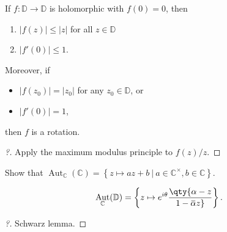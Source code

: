 \begin{theorem}\label{SchwarzzLemma}

If \(f: {\mathbb{D}}\to {\mathbb{D}}\) is holomorphic with \(f(0) = 0\),
then

\begin{enumerate}
\def\labelenumi{\arabic{enumi}.}
\tightlist
\item
  \({\left\lvert {f(z)} \right\rvert} \leq {\left\lvert {z} \right\rvert}\)
  for all \(z\in {\mathbb{D}}\)
\item
  \({\left\lvert {f'(0)} \right\rvert} \leq 1\).
\end{enumerate}

Moreover, if

\begin{itemize}
\tightlist
\item
  \({\left\lvert {f(z_0)} \right\rvert} = {\left\lvert {z_0} \right\rvert}\)
  for any \(z_0\in {\mathbb{D}}\), or
\item
  \({\left\lvert {f'(0)} \right\rvert} = 1\),
\end{itemize}

then \(f\) is a rotation.

\end{theorem}

\begin{proof}[?]

Apply the maximum modulus principle to \(f(z)/z\).

\end{proof}

\begin{exercise}[?]

Show that
\(\mathop{\mathrm{Aut}}_{\mathbb{C}}({\mathbb{C}}) = \left\{{ z \mapsto az+b{~\mathrel{\Big|}~}a\in {\mathbb{C}}^{\times}, b\in {\mathbb{C}}}\right\}\).

\end{exercise}

\begin{theorem}

\begin{align*}
\mathop{\mathrm{Aut}}_{\mathbb{C}}({\mathbb{D}}) = \left\{{ z\mapsto e^{i\theta} \qty{\alpha - z \over 1 - \mkern 1.5mu\overline{\mkern-1.5mu\alpha\mkern-1.5mu}\mkern 1.5mu z} }\right\}
.\end{align*}

\end{theorem}

\begin{proof}[?]

Schwarz lemma.

\end{proof}

